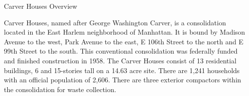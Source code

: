 Carver Houses Overview

Carver Houses, named after George Washington Carver, is a consolidation located in the East Harlem neighborhood of Manhattan. It is bound by Madison Avenue to the west, Park Avenue to the east, E 106th Street to the north and E 99th Street to the south. This conventional consolidation was federally funded and finished construction in 1958. The Carver Houses consist of 13 residential buildings, 6 and 15-stories tall on a 14.63 acre site. There are 1,241 households with an official population of 2,606. There are three exterior compactors within the consolidation for waste collection.